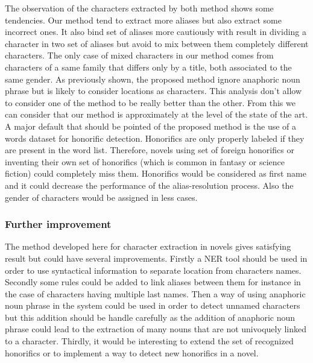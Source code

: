 \documentclass[a4paper, 12pt]{report}
\begin{document}
The observation of the characters extracted by both method shows some tendencies. Our method tend to extract more aliases but also extract some incorrect ones. It also bind set of aliases more cautiously with result in dividing a character in two set of aliases but avoid to mix between them completely different characters. The only case of mixed characters in our method comes from characters of a same family that differs only by a title, both associated to the same gender. As previously shown, the proposed method ignore anaphoric noun phrase but is likely to consider locations as characters. This analysis don't allow to consider one of the method to be really better than the other. From this we can consider that our method is approximately at the level of the state of the art. \\

A major default that should be pointed of the proposed method is the use of a words dataset for honorific detection. Honorifics are only properly labeled if they are present in the word list. Therefore, novels using set of foreign honorifics or inventing their own set of honorifics (which is common in fantasy or science fiction) could completely miss them. Honorifics would be considered as first name and it could decrease the performance of the alias-resolution process. Also the gender of characters would be assigned in less cases. \\

\subsubsection{Further improvement}
The method developed here for character extraction in novels gives satisfying result but could have several improvements. Firstly a NER tool should be used in order to use syntactical information to separate location from characters names. Secondly some rules could be added to link aliases between them for instance in the case of characters having multiple last names. Then a way of using anaphoric noun phrase in the system could be used in order to detect unnamed characters but this addition should be handle carefully as the addition of anaphoric noun phrase could lead to the extraction of many nouns that are not univoquely linked to a character. Thirdly, it would be interesting to extend the set of recognized honorifics or to implement a way to detect new honorifics in a novel.\\
\end{document}
